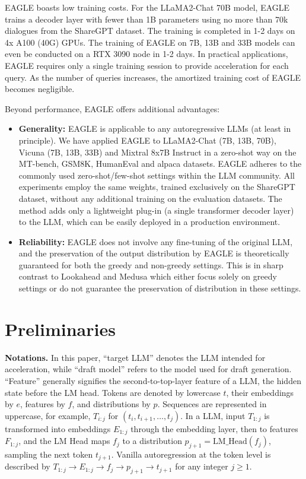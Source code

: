 \documentclass{article}
\theoremstyle{plain}
\theoremstyle{definition}
\theoremstyle{remark}
\begin{document}
EAGLE boasts low training costs. For the LLaMA2-Chat 70B model, EAGLE trains a decoder layer with fewer than 1B parameters using no more than 70k dialogues from the ShareGPT dataset. The training is completed in 1-2 days on 4x A100 (40G) GPUs. The training of EAGLE on 7B, 13B and 33B models can even be conducted on a RTX 3090 node in 1-2 days. In practical applications, EAGLE requires only a single training session to provide acceleration for each query. As the number of queries increases, the amortized training cost of EAGLE becomes negligible.




Beyond performance, EAGLE offers additional advantages:
\begin{itemize}
    \item \textbf{Generality:} EAGLE is applicable to any autoregressive LLMs (at least in principle). We have applied EAGLE to LLaMA2-Chat (7B, 13B, 70B), Vicuna (7B, 13B, 33B) and Mixtral 8x7B Instruct in a zero-shot way on the MT-bench, GSM8K, HumanEval and alpaca datasets.
    EAGLE adheres to the commonly used zero-shot/few-shot settings within the LLM community. All experiments employ the same weights, trained exclusively on the ShareGPT dataset, without any additional training on the evaluation datasets. The method adds only a lightweight plug-in (a single transformer decoder layer) to the LLM, which can be easily deployed in a production environment. 
    \item \textbf{Reliability:} EAGLE does not involve any fine-tuning of the original LLM, and the preservation of the output distribution by EAGLE is theoretically guaranteed for both the greedy and non-greedy settings. 
    This is in sharp contrast to Lookahead and Medusa which either focus solely on greedy settings or do not guarantee the preservation of distribution in these settings.
 
\end{itemize}




\section{Preliminaries}


\textbf{Notations.} In this paper, ``target LLM'' denotes the LLM intended for acceleration, while ``draft model'' refers to the model used for draft generation. ``Feature'' generally signifies the second-to-top-layer feature of a LLM, the hidden state before the LM head. Tokens are denoted by lowercase $t$, their embeddings by $e$, features by $f$, and distributions by $p$. Sequences are represented in uppercase, for example, $T_{i:j}$ for $(t_i,t_{i+1},\ldots,t_{j})$. In a LLM, input $T_{1:j}$ is transformed into embeddings $E_{1:j}$ through the embedding layer, then to features $F_{1:j}$, and the LM Head maps $f_{j}$ to a distribution $p_{j+1}=\text{LM\_Head}(f_{j})$, sampling the next token $t_{j+1}$. Vanilla autoregression at the token level is described by $T_{1:j}\rightarrow E_{1:j}\rightarrow f_j\rightarrow p_{j+1}\rightarrow t_{j+1}$ for any integer $j\ge 1$.
\end{document}
